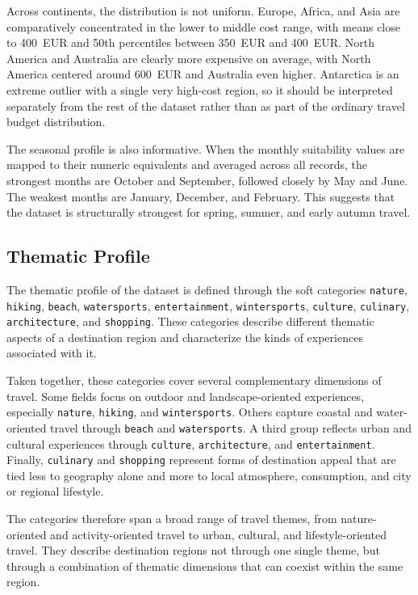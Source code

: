 Across continents, the distribution is not uniform. Europe, Africa, and Asia are comparatively concentrated in the lower to middle cost range, with means close to 400~EUR and 50th percentiles between 350~EUR and 400~EUR. North America and Australia are clearly more expensive on average, with North America centered around 600~EUR and Australia even higher. Antarctica is an extreme outlier with a single very high-cost region, so it should be interpreted separately from the rest of the dataset rather than as part of the ordinary travel budget distribution.

The seasonal profile is also informative. When the monthly suitability values are mapped to their numeric equivalents and averaged across all records, the strongest months are October and September, followed closely by May and June. The weakest months are January, December, and February. This suggests that the dataset is structurally strongest for spring, summer, and early autumn travel. 

\subsection{Thematic Profile}\label{subsection:recommendation-generation:data-grounding:limitations}

The thematic profile of the dataset is defined through the soft categories \texttt{nature}, \texttt{hiking}, \texttt{beach}, \texttt{watersports}, \texttt{entertainment}, \texttt{wintersports}, \texttt{culture}, \texttt{culinary}, \texttt{architecture}, and \texttt{shopping}. These categories describe different thematic aspects of a destination region and characterize the kinds of experiences associated with it.

Taken together, these categories cover several complementary dimensions of travel. Some fields focus on outdoor and landscape-oriented experiences, especially \texttt{nature}, \texttt{hiking}, and \texttt{wintersports}. Others capture coastal and water-oriented travel through \texttt{beach} and \texttt{watersports}. A third group reflects urban and cultural experiences through \texttt{culture}, \texttt{architecture}, and \texttt{entertainment}. Finally, \texttt{culinary} and \texttt{shopping} represent forms of destination appeal that are tied less to geography alone and more to local atmosphere, consumption, and city or regional lifestyle.

The categories therefore span a broad range of travel themes, from nature-oriented and activity-oriented travel to urban, cultural, and lifestyle-oriented travel. They describe destination regions not through one single theme, but through a combination of thematic dimensions that can coexist within the same region.

